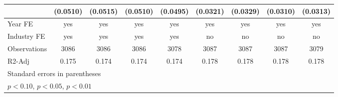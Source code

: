 \begin{table}[htbp]
\begin{tabular}{l*{8}{c}}
                    &    (0.0510)         &    (0.0515)         &    (0.0510)         &    (0.0495)         &    (0.0321)         &    (0.0329)         &    (0.0310)         &    (0.0313)         \\
\hline
Year FE             &         yes         &         yes         &         yes         &         yes         &         yes         &         yes         &         yes         &         yes         \\
Industry FE         &         yes         &         yes         &         yes         &         yes         &          no         &          no         &          no         &          no         \\
Observations        &        3086         &        3086         &        3086         &        3078         &        3087         &        3087         &        3087         &        3079         \\
R2-Adj              &       0.175         &       0.174         &       0.174         &       0.174         &       0.178         &       0.178         &       0.178         &       0.178         \\
\hline\hline
\multicolumn{9}{l}{\footnotesize Standard errors in parentheses}\\
\multicolumn{9}{l}{\footnotesize \sym{*} \(p<0.10\), \sym{**} \(p<0.05\), \sym{***} \(p<0.01\)}\\
\end{tabular}
\end{table}
